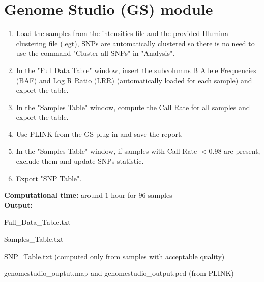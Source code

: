 \documentclass[11pt]{paper}
\begin{document}
\section{Genome Studio (GS) module}
\begin{enumerate}
\item Load the samples from the intensities file and the provided Illumina clustering file (.egt), SNPs are automatically clustered so there is no need to use the command "Cluster all SNPs" in "Analysis".
\item In the "Full Data Table" window, insert the subcolumns B Allele Frequencies (BAF) and Log R Ratio (LRR) (automatically loaded for each sample) and export the table.
\item In the "Samples Table" window, compute the Call Rate for all samples and export the table.
\item Use PLINK from the GS plug-in and save the report.
\item In the "Samples Table" window, if samples with Call Rate $<0.98$ are present, exclude them and update SNPs statistic.
\item Export "SNP Table".
\end{enumerate}
\textbf{Computational time:} around $1$ hour for 96 samples \\ 
\textbf{Output:} 
\begin{itemize}
{\small
\item Full\_Data\_Table.txt
\item Samples\_Table.txt
\item SNP\_Table.txt (computed only from samples with acceptable quality)
\item genomestudio\_ouptut.map and  genomestudio\_output.ped (from PLINK)}
\end{itemize}
\end{document}
